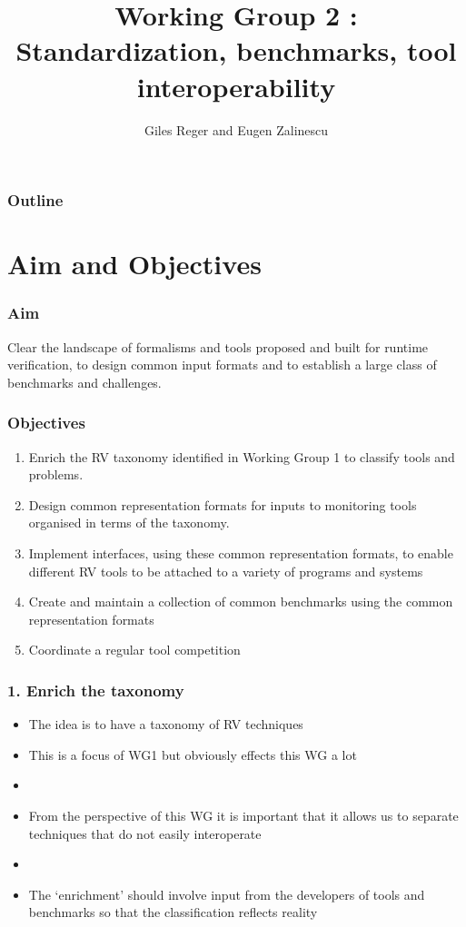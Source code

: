 \documentclass{beamer}
\title[WG2]{Working Group 2 : Standardization, benchmarks, tool interoperability}
\author{Giles Reger and Eugen Zalinescu}
\begin{document}
\begin{frame}
  \titlepage
\end{frame}

\begin{frame}
  \frametitle{Outline}
  \tableofcontents  
\end{frame}

\section{Aim and Objectives}

\begin{frame}
\frametitle{Aim}
\Large
Clear the landscape of formalisms and tools proposed and built for runtime verification, to design common input formats and to establish a large class of benchmarks and challenges.
\end{frame}

\begin{frame}
\frametitle{Objectives}
\begin{enumerate}
	\item Enrich the RV taxonomy identified in Working Group 1 to classify tools and problems.
	\item Design common representation formats for inputs to monitoring tools organised in terms of the taxonomy.
	\item Implement interfaces, using these common representation formats, to enable different RV tools to be attached to a variety of programs and systems
	\item Create and maintain a collection of common benchmarks using the common representation formats
	\item Coordinate a regular tool competition 
\end{enumerate}
\end{frame}

\begin{frame}
\frametitle{1. Enrich the taxonomy}
\begin{itemize}
	\item The idea is to have a taxonomy of RV techniques
	\item This is a focus of WG1 but obviously effects this WG a lot
	\item[]
	\item From the perspective of this WG it is important that it allows us to separate techniques that do not easily interoperate
	\item[]
	\item The `enrichment' should involve input from the developers of tools and benchmarks so that the classification reflects reality
\end{itemize}
\end{frame}
\end{document}
